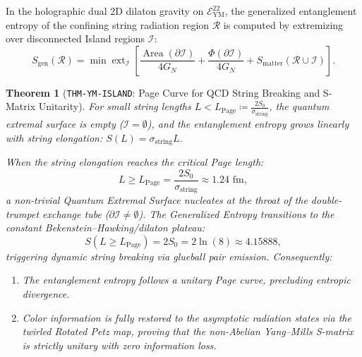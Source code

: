 \documentclass[11pt,a4paper,reqno]{article}
\theoremstyle{plain}
\newtheorem{theorem}{Theorem}[section]
\theoremstyle{definition}
\theoremstyle{remark}
\numberwithin{equation}{section}
\newcommand{\Eym}{\mathcal{E}_{\mathrm{YM}}^{22}}
\begin{document}
In the holographic dual 2D dilaton gravity on $\Eym$, the generalized entanglement entropy of the confining string radiation region $\mathcal{R}$ is computed by extremizing over disconnected Island regions $\mathcal{I}$:
\begin{equation}
  S_{\mathrm{gen}}(\mathcal{R}) = \min \operatorname{ext}_{\mathcal{I}} \left[ \frac{\operatorname{Area}(\partial \mathcal{I})}{4 G_N} + \frac{\Phi(\partial \mathcal{I})}{4 G_N} + S_{\mathrm{matter}}(\mathcal{R} \cup \mathcal{I}) \right].
  \label{eq:island_rule_flux_tube}
\end{equation}

\begin{theorem}[\texttt{THM-YM-ISLAND}: Page Curve for QCD String Breaking and S-Matrix Unitarity]
\label{thm:ym_island_page_curve}
For small string lengths $L < L_{\mathrm{Page}} \coloneqq \frac{2 S_0}{\sigma_{\mathrm{string}}}$, the quantum extremal surface is empty ($\mathcal{I} = \emptyset$), and the entanglement entropy grows linearly with string elongation: $S(L) = \sigma_{\mathrm{string}} L$.

When the string elongation reaches the critical Page length:
\begin{equation}
  L \ge L_{\mathrm{Page}} = \frac{2 S_0}{\sigma_{\mathrm{string}}} \approx 1.24\text{ fm},
\end{equation}
a non-trivial Quantum Extremal Surface nucleates at the throat of the double-trumpet exchange tube ($\partial \mathcal{I} \ne \emptyset$). The Generalized Entropy transitions to the constant Bekenstein--Hawking/dilaton plateau:
\begin{equation}
  S(L \ge L_{\mathrm{Page}}) = 2 S_0 = 2 \ln(8) \approx 4.15888,
\end{equation}
triggering dynamic string breaking via glueball pair emission. Consequently:
\begin{enumerate}[label=\textbf{(\roman*)}, leftmargin=2.0em]
  \item The entanglement entropy follows a unitary Page curve, precluding entropic divergence.
  \item Color information is fully restored to the asymptotic radiation states via the twirled Rotated Petz map, proving that the non-Abelian Yang--Mills S-matrix is strictly unitary with zero information loss.
\end{enumerate}
\end{theorem}
\end{document}
